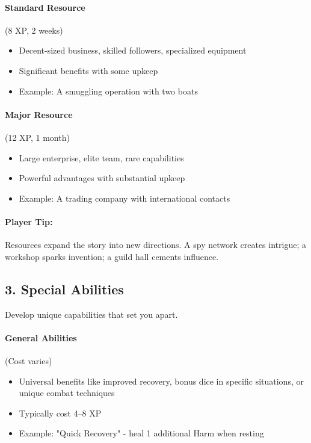 \begin{multicols}{2}
\paragraph{Standard Resource} (8 XP, 2 weeks)
\begin{itemize}
\item Decent-sized business, skilled followers, specialized equipment
\item Significant benefits with some upkeep
\item Example: A smuggling operation with two boats
\end{itemize}

\paragraph{Major Resource} (12 XP, 1 month)
\begin{itemize}
\item Large enterprise, elite team, rare capabilities
\item Powerful advantages with substantial upkeep
\item Example: A trading company with international contacts
\end{itemize}

\paragraph{Player Tip:} Resources expand the story into new directions. A spy network creates intrigue; a workshop sparks invention; a guild hall cements influence.

\subsection*{3. Special Abilities}

Develop unique capabilities that set you apart.

\paragraph{General Abilities} (Cost varies) 
\begin{itemize}
\item Universal benefits like improved recovery, bonus dice in specific situations, or unique combat techniques
\item Typically cost 4–8 XP
\item Example: "Quick Recovery" - heal 1 additional Harm when resting
\end{itemize}


\end{multicols}
